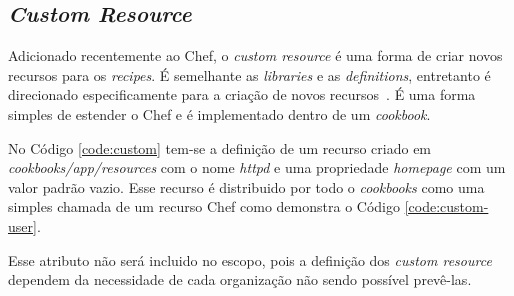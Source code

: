 
\subsection{\textit{Custom Resource}}
\label{sec:lev-rec-cust}

Adicionado recentemente ao Chef, o \textit{custom resource} é uma forma de criar
novos recursos para os \textit{recipes}. É semelhante as \textit{libraries} e as \textit{definitions},
entretanto é direcionado especificamente para a criação de novos recursos~\cite{chefdoc:2016}.
É uma forma simples de estender o Chef e é implementado dentro de um
\textit{cookbook}.

No Código \ref{code:custom} tem-se a definição de um recurso criado em \textit{cookbooks/app/resources}
com o nome \textit{httpd} e uma propriedade \textit{homepage} com um valor padrão vazio.
Esse recurso é distribuido por todo o \textit{cookbooks} como uma simples chamada
de um recurso Chef como demonstra o Código \ref{code:custom-user}.

\noindent\begin{minipage}{.45\textwidth}
  \lstset{style=shell}
  
\end{minipage}\hfill
\begin{minipage}{.45\textwidth}
  \lstset{style=shell}
  
\end{minipage}

Esse atributo não será incluido no escopo, pois a definição dos \textit{custom resource} dependem
da necessidade de cada organização não sendo possível prevê-las.
